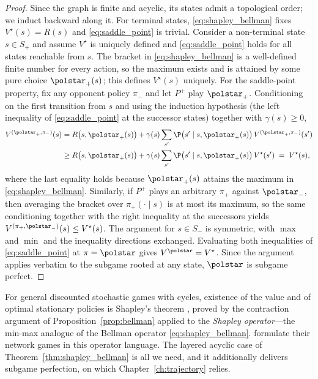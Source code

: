\begin{proof}
Since the graph is finite and acyclic, its states admit a topological order; we induct backward along it. For terminal states, \eqref{eq:shapley_bellman} fixes $V^{\star}(s) = R(s)$ and \eqref{eq:saddle_point} is trivial. Consider a non-terminal state $s \in S_{+}$ and assume $V^{\star}$ is uniquely defined and \eqref{eq:saddle_point} holds for all states reachable from $s$. The bracket in \eqref{eq:shapley_bellman} is a well-defined finite number for every action, so the maximum exists and is attained by some pure choice $\polstar_{+}(s)$; this defines $V^{\star}(s)$ uniquely. For the saddle-point property, fix any opponent policy $\pi_{-}$ and let $P^{+}$ play $\polstar_{+}$. Conditioning on the first transition from $s$ and using the induction hypothesis (the left inequality of \eqref{eq:saddle_point} at the successor states) together with $\gamma(s) \ge 0$,
\begin{align*}
	V^{(\polstar_{+}, \pi_{-})}(s)
	&= R\bigl(s, \polstar_{+}(s)\bigr) + \gamma(s) \sum_{s'} \P\bigl(s' \mid s, \polstar_{+}(s)\bigr)\, V^{(\polstar_{+}, \pi_{-})}(s') \\
	&\ge R\bigl(s, \polstar_{+}(s)\bigr) + \gamma(s) \sum_{s'} \P\bigl(s' \mid s, \polstar_{+}(s)\bigr)\, V^{\star}(s')
	\;=\; V^{\star}(s),
\end{align*}
where the last equality holds because $\polstar_{+}(s)$ attains the maximum in \eqref{eq:shapley_bellman}. Similarly, if $P^{+}$ plays an arbitrary $\pi_{+}$ against $\polstar_{-}$, then averaging the bracket over $\pi_{+}(\cdot \mid s)$ is at most its maximum, so the same conditioning together with the right inequality at the successors yields $V^{(\pi_{+}, \polstar_{-})}(s) \le V^{\star}(s)$. The argument for $s \in S_{-}$ is symmetric, with $\max$ and $\min$ and the inequality directions exchanged. Evaluating both inequalities of \eqref{eq:saddle_point} at $\pi = \polstar$ gives $V^{\polstar} = V^{\star}$. Since the argument applies verbatim to the subgame rooted at any state, $\polstar$ is subgame perfect.
\end{proof}

\begin{remark}\label{rem:shapley_history}
For general discounted stochastic games with cycles, existence of the value and of optimal stationary policies is Shapley's theorem \cite{Shapley1953stochastic}, proved by the contraction argument of Proposition~\ref{prop:bellman} applied to the \emph{Shapley operator}---the min-max analogue of the Bellman operator \eqref{eq:shapley_bellman}. \textcite{Gaubert2025} formulate their network games in this operator language. The layered acyclic case of Theorem~\ref{thm:shapley_bellman} is all we need, and it additionally delivers subgame perfection, on which Chapter~\ref{ch:trajectory} relies.
\end{remark}

